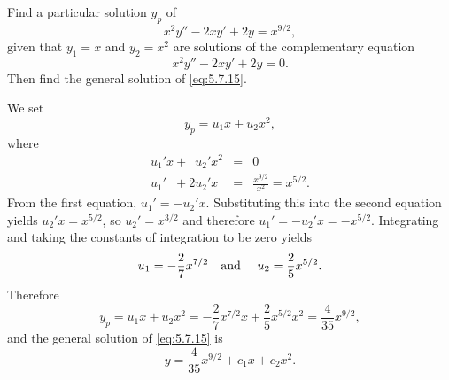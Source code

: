 \setcounter{example}{0}
\setcounter{equation}{14}
\begin{example}
  \label{example:5.7.1} \rm Find a particular solution $y_{p}$ of
  \begin{equation}
    \label{eq:5.7.15}x^{2}y''-2xy'+2y=x^{9/2},
  \end{equation}
  given that $y_{1}=x$ and $y_{2}=x^{2}$ are solutions of the complementary equation
  \[
    x^{2}y''-2xy'+2y=0.
  \]
  Then find the general solution of \eqref{eq:5.7.15}.
\end{example}
\begin{examplesolution}
\solution We set
\[
  y_{p}=u_{1}x+u_{2}x^{2},
\]
where
\begin{eqnarray*}
  u_{1}'x+\phantom{2}u_{2}'x^{2}           & = & 0 \\
  u_{1}'\phantom{x}+2u_{2}'x\phantom{^{2}} & = & \frac{x^{9/2}}{x^{2}}=x^{5/2}.
\end{eqnarray*}
From the first equation, $u_{1}'=-u_{2}'x$. Substituting this into the second equation yields
$u_{2}'x=x^{5/2}$, so $u_{2}'=x^{3/2}$ and therefore $u_{1}'=-u_{2}'x=-x^{5/2}$. Integrating and
taking the constants of integration to be zero yields
\[
  u_{1}=-\frac{2}{7}x^{7/2}\mbox{\quad and \quad}u_{2}=\frac{2}{5}x^{5/2}.
\]
Therefore
\[
  y_{p}=u_{1}x+u_{2}x^{2}=-\frac{2}{7}x^{7/2}x+\frac{2}{5}x^{5/2}x^{2}=\frac{4}{35}x^{9/2},
\]
and the general solution of \eqref{eq:5.7.15} is
\[
  y=\frac{4}{35}x^{9/2}+c_{1}x+c_{2}x^{2}.
\]
\end{examplesolution}

